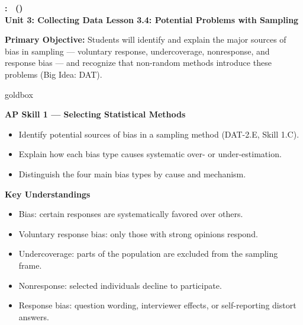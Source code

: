 \documentclass[10pt]{article}
\newcommand{\UnitNumberName}{Unit 3: Collecting Data \quad}
\newcommand{\LessonNumberName}{Lesson 3.4: Potential Problems with Sampling}
\begin{document}
\begin{center}
    {\Large\bfseries \CourseName: \SchoolYear\ (\MeetingLength) \\
    {\small\bfseries \UnitNumberName \LessonNumberName}}
\end{center}

\begin{tcolorbox}[colback=sky, colframe=navy, boxrule=0.9pt, arc=2mm,
    left=2mm, right=2mm, top=1.5mm, bottom=1.5mm]
    \textbf{Primary Objective:} Students will identify and explain the major sources
    of bias in sampling --- voluntary response, undercoverage, nonresponse, and
    response bias --- and recognize that non-random methods introduce these problems
    (Big Idea: DAT).
\end{tcolorbox}

\renewcommand{\arraystretch}{1.6}
\begin{skillbox}{goldbox}
\begin{minipage}[t]{0.48\linewidth}
    \textbf{AP Skill 1 --- Selecting Statistical Methods}
    \begin{itemize}
        \item Identify potential sources of bias in a sampling method (DAT-2.E,
              Skill 1.C).
        \item Explain how each bias type causes systematic over- or under-estimation.
        \item Distinguish the four main bias types by cause and mechanism.
    \end{itemize}
\end{minipage}
\hfill
\begin{minipage}[t]{0.48\linewidth}
    \textbf{Key Understandings}
    \begin{itemize}
        \item Bias: certain responses are systematically favored over others.
        \item Voluntary response bias: only those with strong opinions respond.
        \item Undercoverage: parts of the population are excluded from the sampling
              frame.
        \item Nonresponse: selected individuals decline to participate.
        \item Response bias: question wording, interviewer effects, or self-reporting
              distort answers.
    \end{itemize}
\end{minipage}
\end{skillbox}
\end{document}
